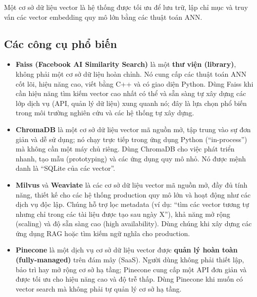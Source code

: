 Một cơ sở dữ liệu vector là hệ thống được tối ưu để lưu trữ, lập chỉ mục và truy vấn các vector embedding quy mô lớn bằng các thuật toán ANN.

\subsection{Các công cụ phổ biến}
\label{ssec:vector_db_tools}
\begin{itemize}
    \item \textbf{Faiss (Facebook AI Similarity Search)} là một \textbf{thư viện (library)}, không phải một cơ sở dữ liệu hoàn chỉnh. Nó cung cấp các thuật toán ANN cốt lõi, hiệu năng cao, viết bằng C++ và có giao diện Python. Dùng Faiss khi cần hiệu năng tìm kiếm vector cao nhất có thể và sẵn sàng tự xây dựng các lớp dịch vụ (API, quản lý dữ liệu) xung quanh nó; đây là lựa chọn phổ biến trong môi trường nghiên cứu và các hệ thống tự xây dựng.
    \item \textbf{ChromaDB} là một cơ sở dữ liệu vector mã nguồn mở, tập trung vào sự đơn giản và dễ sử dụng; nó chạy trực tiếp trong ứng dụng Python (“in-process”) mà không cần một máy chủ riêng. Dùng ChromaDB cho việc phát triển nhanh, tạo mẫu (prototyping) và các ứng dụng quy mô nhỏ. Nó được mệnh danh là “SQLite của các vector”.
    \item \textbf{Milvus} và \textbf{Weaviate} là các cơ sở dữ liệu vector mã nguồn mở, đầy đủ tính năng, thiết kế cho các hệ thống production quy mô lớn và hoạt động như các dịch vụ độc lập. Chúng hỗ trợ lọc metadata (ví dụ: “tìm các vector tương tự nhưng chỉ trong các tài liệu được tạo sau ngày X”), khả năng mở rộng (scaling) và độ sẵn sàng cao (high availability). Dùng chúng khi xây dựng các ứng dụng RAG hoặc tìm kiếm ngữ nghĩa cho production.
    \item \textbf{Pinecone} là một dịch vụ cơ sở dữ liệu vector được \textbf{quản lý hoàn toàn (fully-managed)} trên đám mây (SaaS). Người dùng không phải thiết lập, bảo trì hay mở rộng cơ sở hạ tầng; Pinecone cung cấp một API đơn giản và được tối ưu cho hiệu năng cao và độ trễ thấp. Dùng Pinecone khi muốn có vector search mà không phải tự quản lý cơ sở hạ tầng.
\end{itemize}